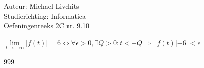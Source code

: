 \documentclass[a4paper]{article}
\begin{document}
  
\noindent \large Auteur: Michael Livchits \\
\noindent \large Studierichting: Informatica\\
\noindent \large Oefeningenreeks 2C nr. 9.10\\

\medskip

\normalsize

$ \lim\limits_{t\rightarrow -\infty}|f(t)| = 6 \Leftrightarrow \forall \epsilon > 0, \exists Q > 0 : t < -Q \Rightarrow ||f(t)| - 6| < \epsilon  $\\

\begin{thebibliography}{999}
\end{thebibliography}
\end{document}
